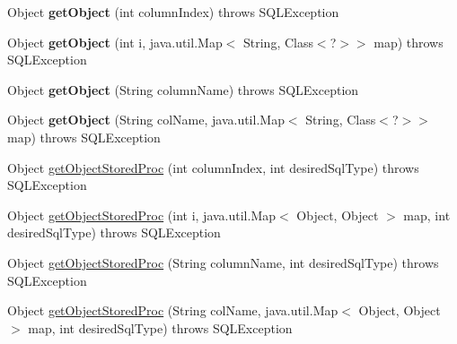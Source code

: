 \begin{DoxyCompactItemize}
Object {\bfseries get\+Object} (int column\+Index)  throws S\+Q\+L\+Exception 
\item 
\mbox{\label{classcom_1_1mysql_1_1cj_1_1jdbc_1_1result_1_1_result_set_impl_a74095e4f567e73fa09feaba8b1d62d53}} 
Object {\bfseries get\+Object} (int i, java.\+util.\+Map$<$ String, Class$<$?$>$$>$ map)  throws S\+Q\+L\+Exception 
\item 
\mbox{\label{classcom_1_1mysql_1_1cj_1_1jdbc_1_1result_1_1_result_set_impl_a4a151a623173f8c8eaef246cb78745d1}} 
Object {\bfseries get\+Object} (String column\+Name)  throws S\+Q\+L\+Exception 
\item 
\mbox{\label{classcom_1_1mysql_1_1cj_1_1jdbc_1_1result_1_1_result_set_impl_ac353de011fc57fa9723d09343a2716be}} 
Object {\bfseries get\+Object} (String col\+Name, java.\+util.\+Map$<$ String, Class$<$?$>$$>$ map)  throws S\+Q\+L\+Exception 
\item 
Object \mbox{\hyperlink{classcom_1_1mysql_1_1cj_1_1jdbc_1_1result_1_1_result_set_impl_a3dfdc0ed2f2b5498834ffbf5a0269e1a}{get\+Object\+Stored\+Proc}} (int column\+Index, int desired\+Sql\+Type)  throws S\+Q\+L\+Exception 
\item 
Object \mbox{\hyperlink{classcom_1_1mysql_1_1cj_1_1jdbc_1_1result_1_1_result_set_impl_a70dfce90a5b666ec4699ca1b91a7a713}{get\+Object\+Stored\+Proc}} (int i, java.\+util.\+Map$<$ Object, Object $>$ map, int desired\+Sql\+Type)  throws S\+Q\+L\+Exception 
\item 
Object \mbox{\hyperlink{classcom_1_1mysql_1_1cj_1_1jdbc_1_1result_1_1_result_set_impl_a8e01634eee20129d559ee3ccfa59b24f}{get\+Object\+Stored\+Proc}} (String column\+Name, int desired\+Sql\+Type)  throws S\+Q\+L\+Exception 
\item 
Object \mbox{\hyperlink{classcom_1_1mysql_1_1cj_1_1jdbc_1_1result_1_1_result_set_impl_aa9d0a1c264c70954b3fbc1f81f0e7a9b}{get\+Object\+Stored\+Proc}} (String col\+Name, java.\+util.\+Map$<$ Object, Object $>$ map, int desired\+Sql\+Type)  throws S\+Q\+L\+Exception 
\item 
\mbox{\label{classcom_1_1mysql_1_1cj_1_1jdbc_1_1result_1_1_result_set_impl_a861229b18588fc13fa9e7996666c2afc}} 

\end{DoxyCompactItemize}
